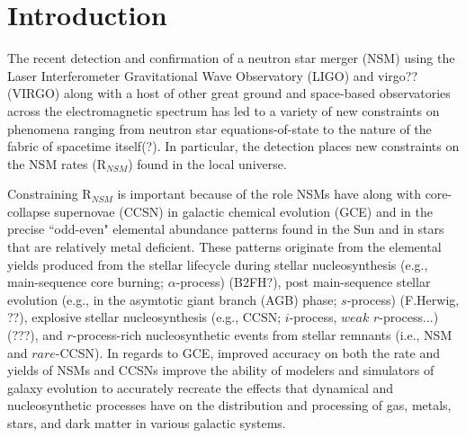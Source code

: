 \section{Introduction}
\label{intro} 
The recent detection and confirmation of a neutron star merger (NSM) using the Laser Interferometer Gravitational Wave Observatory (LIGO) and virgo?? (VIRGO) along with a host of other great ground and space-based observatories across the electromagnetic spectrum has led to a variety of new constraints on phenomena ranging from neutron star equations-of-state to the nature of the fabric of spacetime itself(?). In particular, the detection places new constraints on the NSM rates (R$_{NSM}$) found in the local universe. 

Constraining R$_{NSM}$ is important because of the role NSMs have along with core-collapse supernovae (CCSN) in galactic chemical evolution (GCE) and in the precise ``odd-even" elemental abundance patterns found in the Sun and in stars that are relatively metal deficient. These patterns originate from the elemental yields produced from the stellar lifecycle during stellar nucleosynthesis (e.g., main-sequence core burning; $\alpha$-process) (B2FH?), post main-sequence stellar evolution (e.g., in the asymtotic giant branch (AGB) phase; $s$-process) (F.Herwig, ??), explosive stellar nucleosynthesis (e.g., CCSN; $i$-process, $weak$ $r$-process...) (???), and $r$-process-rich nucleosynthetic events from stellar remnants (i.e., NSM and $rare$-CCSN). In regards to GCE, improved accuracy on both the rate and yields of NSMs and CCSNs improve the ability of modelers and simulators of galaxy evolution to accurately recreate the effects that dynamical and nucleosynthetic processes have on the distribution and processing of gas, metals, stars, and dark matter in various galactic systems.

